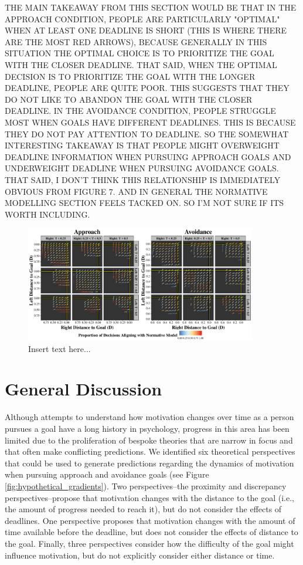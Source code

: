 \documentclass[a4paper,doc,natbib,donotrepeattitle]{apa6}
\begin{document}
THE MAIN TAKEAWAY FROM THIS SECTION WOULD BE THAT IN THE APPROACH CONDITION, PEOPLE ARE PARTICULARLY "OPTIMAL" WHEN AT LEAST ONE DEADLINE IS SHORT (THIS IS WHERE THERE ARE THE MOST RED ARROWS), BECAUSE GENERALLY IN THIS SITUATION THE OPTIMAL CHOICE IS TO PRIORITIZE THE GOAL WITH THE CLOSER DEADLINE. THAT SAID, WHEN THE OPTIMAL DECISION IS TO PRIORITIZE THE GOAL WITH THE LONGER DEADLINE, PEOPLE ARE QUITE POOR. THIS SUGGESTS THAT THEY DO NOT LIKE TO ABANDON THE GOAL WITH THE CLOSER DEADLINE. IN THE AVOIDANCE CONDITION, PEOPLE STRUGGLE MOST WHEN GOALS HAVE DIFFERENT DEADLINES. THIS IS BECAUSE THEY DO NOT PAY ATTENTION TO DEADLINE. SO THE SOMEWHAT INTERESTING TAKEAWAY IS THAT PEOPLE MIGHT OVERWEIGHT DEADLINE INFORMATION WHEN PURSUING APPROACH GOALS AND UNDERWEIGHT DEADLINE WHEN PURSUING AVOIDANCE GOALS. THAT SAID, I DON'T THINK THIS RELATIONSHIP IS IMMEDIATELY OBVIOUS FROM FIGURE 7. AND IN GENERAL THE NORMATIVE MODELLING SECTION FEELS TACKED ON. SO I'M NOT SURE IF ITS WORTH INCLUDING.


\begin{figure}[h!]
\centering
\includegraphics[width=0.9\textwidth]{normative_gradient.pdf}
\caption{\label{fig:normative_gradients} Insert text here...}
\end{figure}


\section{General Discussion}

Although attempts to understand how motivation changes over time as a person pursues a goal have a long history in psychology, progress in this area has been limited due to the proliferation of bespoke theories that are narrow in focus and that often make conflicting predictions. We identified six theoretical perspectives that could be used to generate predictions regarding the dynamics of motivation when pursuing approach and avoidance goals (see Figure \ref{fig:hypothetical_gradients}). Two perspectives--the proximity and discrepancy perspectives--propose that motivation changes with the distance to the goal (i.e., the amount of progress needed to reach it), but do not consider the effects of deadlines. One perspective proposes that motivation changes with the amount of time available before the deadline, but does not consider the effects of distance to the goal. Finally, three perspectives consider how the difficulty of the goal might influence motivation, but do not explicitly consider either distance or time.
\end{document}
